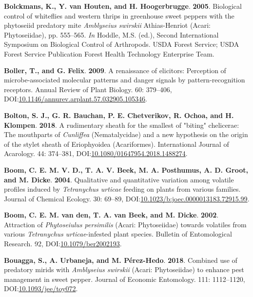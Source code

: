 \documentclass[12pt,final,CPage]{ufthesis}
\newlength{\cslhangindent}
\newenvironment{CSLReferences}[2] %
{%
	\setlength{\parindent}{0pt}
	\ifodd #1 \everypar{\setlength{\hangindent}{\cslhangindent}}\ignorespaces\fi
	\ifnum #2 > 0
	\setlength{\parskip}{#2\baselineskip}
	\fi
}%
{}
\begin{document}
{\begin{CSLReferences}{1}{0}
  \leavevmode{}%
  \textbf{Bolckmans, K., Y. van Houten, and H. Hoogerbrugge}. \textbf{2005}. Biological control of whiteflies and western thrips in greenhouse sweet peppers with the phytoseiid predatory mite {\emph{Amblyseius swirskii}} {Athias-Henriot} ({Acari}: {Phytoseiidae}), pp. 555--565. \emph{In} Hoddle, M.S. (ed.), Second International Symposium on Biological Control of Arthropods. USDA Forest Service; USDA Forest Service Publication Forest Health Technology Enterprise Team.

  \leavevmode{}%
  \textbf{Boller, T., and G. Felix}. \textbf{2009}. A renaissance of elicitors: Perception of microbe-associated molecular patterns and danger signals by pattern-recognition receptors. Annual Review of Plant Biology. 60: 379--406, DOI:\href{https://doi.org/10.1146/annurev.arplant.57.032905.105346}{10.1146/annurev.arplant.57.032905.105346}.

  \leavevmode{}%
  \textbf{Bolton, S. J., G. R. Bauchan, P. E. Chetverikov, R. Ochoa, and H. Klompen}. \textbf{2018}. A rudimentary sheath for the smallest of "biting" chelicerae: The mouthparts of {\emph{Cunliffea}} ({Nematalycidae}) and a new hypothesis on the origin of the stylet sheath of {Eriophyoidea} ({Acariformes}). International Journal of Acarology. 44: 374--381, DOI:\href{https://doi.org/10.1080/01647954.2018.1488274}{10.1080/01647954.2018.1488274}.

  \leavevmode{}%
  \textbf{Boom, C. E. M. V. D., T. A. V. Beek, M. A. Posthumus, A. D. Groot, and M. Dicke}. \textbf{2004}. Qualitative and quantitative variation among volatile profiles induced by {\emph{Tetranychus urticae}} feeding on plants from various families. Journal of Chemical Ecology. 30: 69--89, DOI:\href{https://doi.org/10.1023/b:joec.0000013183.72915.99}{10.1023/b:joec.0000013183.72915.99}.

  \leavevmode{}%
  \textbf{Boom, C. E. M. van den, T. A. van Beek, and M. Dicke}. \textbf{2002}. Attraction of {\emph{Phytoseiulus persimilis}} ({Acari}: {Phytoseiidae}) towards volatiles from various {\emph{Tetranychus urticae}}-infested plant species. Bulletin of Entomological Research. 92, DOI:\href{https://doi.org/10.1079/ber2002193}{10.1079/ber2002193}.

  \leavevmode{}%
  \textbf{Bouagga, S., A. Urbaneja, and M. Pérez-Hedo}. \textbf{2018}. Combined use of predatory mirids with {\emph{Amblyseius swirskii}} ({Acari}: {Phytoseiidae}) to enhance pest management in sweet pepper. Journal of Economic Entomology. 111: 1112--1120, DOI:\href{https://doi.org/10.1093/jee/toy072}{10.1093/jee/toy072}.


\end{CSLReferences}}
\end{document}
